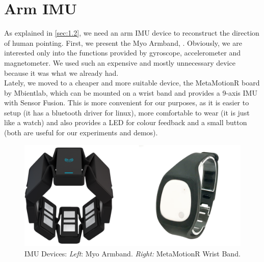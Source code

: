 \section{Arm IMU}
As explained in \ref{sec:1.2}, we need an arm IMU device to reconstruct the direction of human pointing. First, we present the Myo Armband, . Obviously, we are interested only into the functions provided by gyroscope, accelerometer and magnetometer. We used such an expensive and mostly unnecessary device because it was what we already had.\\ Lately, we moved to a cheaper and more suitable device, the MetaMotionR board by Mbientlab, which can be mounted on a wrist band and provides a 9-axis IMU with Sensor Fusion. This is more convenient for our purposes, as it is easier to setup (it has a bluetooth driver for linux), more comfortable to wear (it is just like a watch) and also provides a LED for colour feedback and a small button (both are useful for our experiments and demos).
\begin{figure}
	\centering
	\includegraphics[width=\textwidth]{img/IMUS.png}%
	\caption{IMU Devices: \emph{Left}: Myo Armband. \emph{Right:} MetaMotionR Wrist Band.}
	\label{fig:IMUS}
\end{figure}
